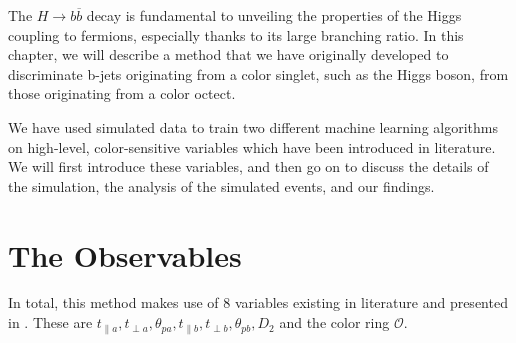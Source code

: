 \documentclass[10pt,a4paper]{book}
\begin{document}
The $H\rightarrow b\overline{b}$ decay is fundamental to unveiling the properties of the Higgs coupling to fermions, especially thanks to its large branching ratio. In this chapter, we will describe a method that we have originally developed to discriminate b-jets originating from a color singlet, such as the Higgs boson, from those originating from a color octect. 

We have used simulated data to train two different machine learning algorithms on high-level, color-sensitive variables which have been introduced in literature. We will first introduce these variables, and then go on to discuss the details of the simulation, the analysis of the simulated events, and our findings.

\section{The Observables}
In total, this method makes use of 8 variables existing in literature and presented in \cite{Larkoski:2019fsm, Larkoski:2014gra, Buckley:2020kdp}. These are $t_{\parallel a}, t_{\perp a}, \theta_{pa}, t_{\parallel b}, t_{\perp b}, \theta_{pb}, D_2$ and the color ring $\mathcal{O}$.
\end{document}

